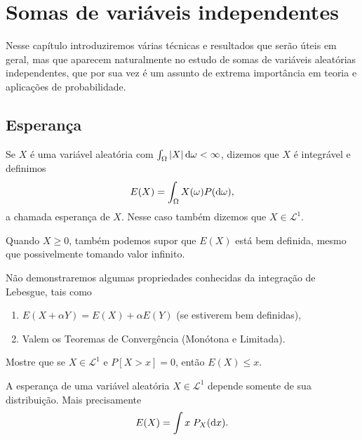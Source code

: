 \chapter{Somas de variáveis independentes}

Nesse capítulo introduziremos várias técnicas e resultados que serão úteis em geral, mas que aparecem naturalmente no estudo de somas de variáveis aleatórias independentes, que por sua vez é um assunto de extrema importância em teoria e aplicações de probabilidade.

\section{Esperança}

\begin{definition}
  Se $X$ é uma variável aleatória com $\int_\Omega |X| \mathop{}\!\mathrm{d} \omega < \infty$, dizemos que $X$ é integrável  e definimos
  \begin{equation}
    E(X) = \int_\Omega X(\omega) P(\mathop{}\!\mathrm{d} \omega),
  \end{equation}
  a chamada esperança de $X$. 
  Nesse caso também dizemos que $X \in \mathcal{L}^1$.
\end{definition}

Quando $X \geq 0$, também podemos supor que $E(X)$ está bem definida, mesmo que possivelmente tomando valor infinito.

Não demonstraremos algumas propriedades conhecidas da integração de Lebesgue, tais como
\begin{enumerate}[\quad a)]
\item $E(X + \alpha Y) = E(X) + \alpha E(Y)$ (se estiverem bem definidas),
\item Valem os Teoremas de Convergência (Monótona e Limitada).
\end{enumerate}

\begin{exercise}
  Mostre que se $X \in \mathcal{L}^1$ e $P[X > x] = 0$, então $E(X) \leq x$.
\end{exercise}

\begin{lemma}
  A esperança de uma variável aleatória $X \in \mathcal{L}^1$ depende somente de sua distribuição.
  Mais precisamente
  \begin{equation}
    E(X) = \int x \; P_X (\mathop{}\!\mathrm{d} x).
  \end{equation}
\end{lemma}

